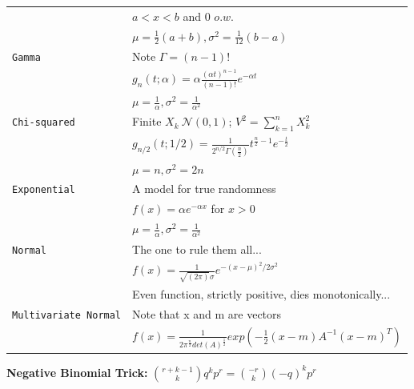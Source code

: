 \documentclass[10pt,landscape]{article}
\begin{document}
\begin{multicols*}{3}
\begin{tabular}{@{}ll@{}}
	\verb!! &$ a<x<b$ and $0$ $o.w.$\\
	\verb!! &$\mu=\frac{1}{2}(a+b), \sigma^2=\frac{1}{12}(b-a)$\\
	\verb!Gamma!& Note $\Gamma =(n-1)!$  \\
	\verb!! &$g_n(t;\alpha)=\alpha \frac{(\alpha t)^{n-1}} {(n-1)!}e^{-\alpha t}$\\
	\verb!! &$\mu=\frac{1}{\alpha}  , \sigma^2=\frac{1}{\alpha^2}$\\
	\verb!Chi-squared!  & Finite $X_k ~\mathcal{N}(0,1)$; $V^2=\sum_{k=1}^{n} X_k^2$ \\
	\verb!! & $g_{n/2}(t;1/2)=\frac{1}{2^{n/2}\Gamma(\frac{n}{2})}t^{\frac{n}{2} -1}e^{-\frac{t}{2}}$\\
	\verb!! &$\mu=n  , \sigma^2=2n$\\	
	\verb!Exponential!  & A model for true randomness \\
	\verb!! & $f(x)=\alpha e^{-\alpha x}$ for $x>0$\\
	\verb!! &$\mu=\frac{1}{\alpha}  , \sigma^2=\frac{1}{\alpha^2}$\\
	\verb!Normal! & The one to rule them all... \\
	\verb!! & $f(x) = \frac{1}{\sqrt{(2 \pi)} \sigma} e^{-(x-\mu)^{2}/2 \sigma^{2}}$ \\
	\verb!! & \hspace{-75pt} Even function, strictly positive, dies monotonically...\\
	\verb!Multivariate Normal! & Note that x and m are vectors \\
	\verb!! & \hspace{-55pt}$f(x)=\frac{1}{2\pi^{\frac{n}{2}} det(A)^{\frac{1}{2}}}exp(-\frac{1}{2}(x-m)A^{-1}(x-m)^T)$
	
\end{tabular}

\textbf{Negative Binomial Trick:}
$ { r+k-1 \choose k}q^kp^r={-r \choose k}(-q)^kp^r$

\end{multicols*}
\end{document}
